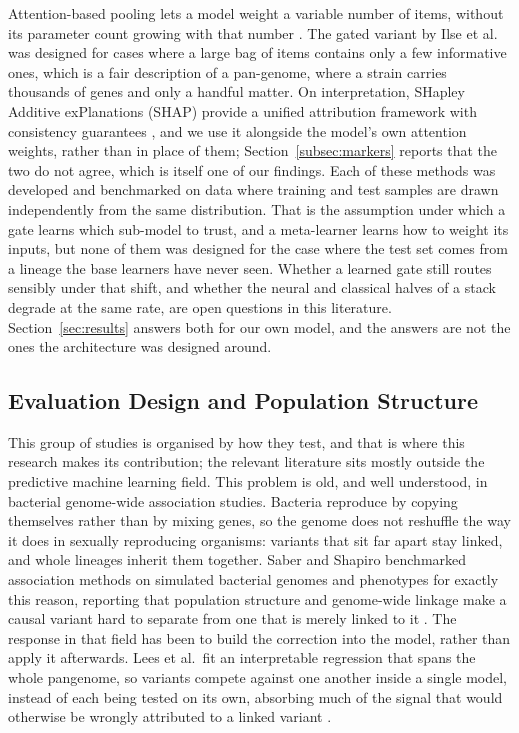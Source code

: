 \documentclass[journal]{IEEEtran}
\begin{document}
Attention-based pooling lets a model weight a variable number of items, without its
parameter count growing with that number \cite{vaswani2017attention}. The gated
variant by Ilse et al.\ \cite{ilse2018attention} was designed for cases where a
large bag of items contains only a few informative ones, which is a fair
description of a pan-genome, where a strain carries thousands of genes and only a
handful matter. On interpretation, SHapley Additive exPlanations (SHAP) provide a
unified attribution framework
with consistency guarantees \cite{lundberg2017shap}, and we use it alongside the
model's own attention weights, rather than in place of them;
Section~\ref{subsec:markers} reports that the two do not agree, which is itself one
of our findings. Each of these methods was developed and benchmarked on data where
training and test samples are drawn independently from the same distribution. That
is the assumption under which a gate learns which sub-model to trust, and a
meta-learner learns how to weight its inputs, but none of them was designed for the
case where the test set comes from a lineage the base learners have never seen.
Whether a learned gate still routes sensibly under that shift, and whether the
neural and classical halves of a stack degrade at the same rate, are open questions
in this literature. Section~\ref{sec:results} answers both for our own model, and
the answers are not the ones the architecture was designed around.

\subsection{Evaluation Design and Population Structure}
\label{subsec:evaldesign}

This group of studies is organised by how they test, and that is where this
research makes its contribution; the relevant literature sits mostly outside the
predictive machine learning field. This problem is old, and well understood, in
bacterial genome-wide association studies. Bacteria reproduce by copying themselves
rather than by mixing genes, so the genome does not reshuffle the way it does in
sexually reproducing organisms: variants that sit far apart stay linked, and whole
lineages inherit them together. Saber and Shapiro benchmarked association methods
on simulated bacterial genomes and phenotypes for exactly this reason, reporting
that population structure and genome-wide linkage make a causal variant hard to
separate from one that is merely linked to it \cite{saber2020bacgwas}. The response
in that field has been to build the correction into the model, rather than apply it
afterwards. Lees et al.\ fit an interpretable regression that spans the whole
pangenome, so variants compete against one another inside a single model, instead
of each being tested on its own, absorbing much of the signal that would otherwise
be wrongly attributed to a linked variant \cite{lees2020pyseer}.
\end{document}
